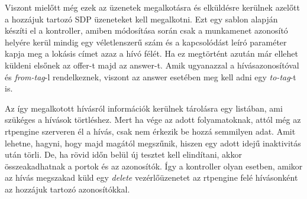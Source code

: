 Viszont mielőtt még ezek az üzenetek megalkotásra és elküldésre kerülnek azelőtt
a hozzájuk tartozó SDP üzeneteket kell megalkotni. Ezt egy sablon alapján készíti el 
a kontroller, amiben módosítása során csak a munkamenet azonosító helyére kerül
mindig egy véletlenszerű szám és a kapcsolódást leíró paraméter kapja meg a lokásis 
címet azaz a hívó félét. Ha ez megtörtént azután már ellehet küldeni elsőnek az offer-t
majd az answer-t. Amik ugyanazzal a hívásazonosítóval és \textit{from-tag}-l rendelkeznek,
viszont az answer esetében meg kell adni egy \textit{to-tag}-t is.

Az így megalkotott hívásról információk kerülnek tárolásra egy listában, ami szükéges
a hívások törtléshez. Mert ha vége az adott folyamatoknak, attól még az rtpengine szerveren
él a hívás, csak nem érkezik be hozzá semmilyen adat. Amit lehetne, hagyni, hogy majd 
magától megszűnik, hiszen egy adott idejű inaktivitás után törli. De, ha rövid időn 
belül új tesztet kell elindítani, akkor összeakadhatnak a portok és az azonosítók. Így a 
kontroller olyan esetben, amikor az hívás megszakad küld egy \textit{delete} vezérlőüzenetet
az rtpengine felé hívásonként az hozzájuk tartozó azonosítókkal.

